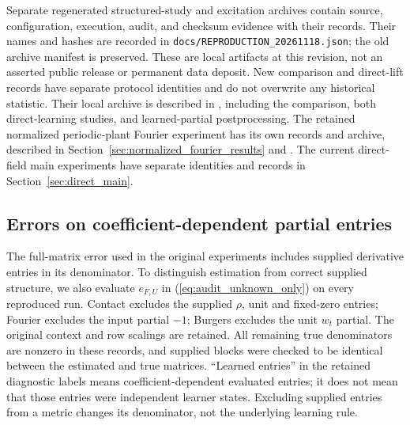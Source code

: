 \documentclass[journal]{IEEEtran}
\begin{document}
Separate regenerated structured-study and excitation archives contain source,
configuration, execution, audit, and checksum evidence with their records.
Their names and hashes are recorded in
\texttt{docs/REPRODUCTION\_20261118.json}; the old archive manifest is
preserved. These are local artifacts at this revision, not an asserted
public release or permanent data deposit. New comparison and direct-lift
records have separate protocol identities and do not overwrite any historical
statistic. Their local archive is described in
, including the comparison,
both direct-learning studies, and learned-partial postprocessing.
The retained normalized periodic-plant Fourier experiment has its own records and archive,
described in Section~\ref{sec:normalized_fourier_results} and
. The current direct-field
main experiments have separate identities and records in
Section~\ref{sec:direct_main}.

\subsection{Errors on coefficient-dependent partial entries}
The full-matrix error used in the original experiments includes supplied
derivative entries in its denominator. To distinguish estimation from
correct supplied structure, we also evaluate $e_{F,U}$ in
(\ref{eq:audit_unknown_only}) on every reproduced run. Contact excludes
the supplied $\rho$, unit and fixed-zero entries; Fourier excludes the
input partial $-1$; Burgers excludes the unit $w_t$ partial. The original
context and row scalings are retained. All remaining true denominators
are nonzero in these records, and supplied blocks were checked to be
identical between the estimated and true matrices. ``Learned entries'' in
the retained diagnostic labels means coefficient-dependent evaluated
entries; it does not mean that those entries were independent learner
states. Excluding supplied entries from a metric changes its denominator,
not the underlying learning rule.
\end{document}
